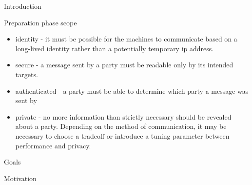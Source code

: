 \begin{frame}{Introduction}
\begin{block}{Preparation phase scope}
\begin{itemize}
  \begin{itemize}
  \tightlist
  \item
    identity - it must be possible for the machines to communicate based
    on a long-lived identity rather than a potentially temporary
    \gls{ip} address.
  \item
    secure - a message sent by a party must be readable only by its
    intended targets.
  \item
    authenticated - a party must be able to determine which party a
    message was sent by
  \item
    private - no more information than strictly necessary should be
    revealed about a party. Depending on the method of communication, it
    may be necessary to choose a tradeoff or introduce a tuning
    parameter between performance and privacy.
  \end{itemize}
\end{itemize}
\end{block}
\end{frame}

\begin{frame}{Goals}
\protect\hypertarget{goals}{}
\begin{block}{Motivation}
\protect\hypertarget{motivation}{}
\end{block}
\end{frame}

